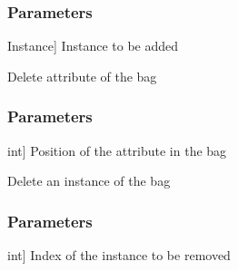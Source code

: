 \documentclass[letterpaper,10pt,english]{sphinxmanual}
\begin{document}
\begin{fulllineitems}
\begin{fulllineitems}
\subsubsection{Parameters}
\label{\detokenize{data/_autosummary/miml.data.bag.Bag:id1}}\begin{description}
\sphinxlineitem{instance}{[}Instance{]}
\sphinxAtStartPar
Instance to be added

\end{description}

\end{fulllineitems}


\begin{fulllineitems}
\label{\detokenize{data/_autosummary/miml.data.bag.Bag:miml.data.bag.Bag.delete_attribute}}
\pysigstartsignatures
{}
\pysigstopsignatures
\sphinxAtStartPar
Delete attribute of the bag


\subsubsection{Parameters}
\label{\detokenize{data/_autosummary/miml.data.bag.Bag:id2}}\begin{description}
\sphinxlineitem{position}{[}int{]}
\sphinxAtStartPar
Position of the attribute in the bag

\end{description}

\end{fulllineitems}


\begin{fulllineitems}
\label{\detokenize{data/_autosummary/miml.data.bag.Bag:miml.data.bag.Bag.delete_instance}}
\pysigstartsignatures
{}
\pysigstopsignatures
\sphinxAtStartPar
Delete an instance of the bag


\subsubsection{Parameters}
\label{\detokenize{data/_autosummary/miml.data.bag.Bag:id3}}\begin{description}
\sphinxlineitem{index}{[}int{]}
\sphinxAtStartPar
Index of the instance to be removed


\end{description}
\end{fulllineitems}
\end{fulllineitems}
\end{document}
